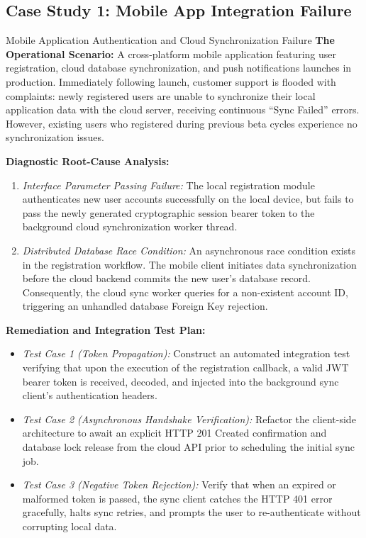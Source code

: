 \documentclass[11pt,a4paper]{article}
\begin{document}
\subsection{Case Study 1: Mobile App Integration Failure}
\begin{casestudybox}{Mobile Application Authentication and Cloud Synchronization Failure}
\textbf{The Operational Scenario:} A cross-platform mobile application featuring user registration, cloud database synchronization, and push notifications launches in production. Immediately following launch, customer support is flooded with complaints: newly registered users are unable to synchronize their local application data with the cloud server, receiving continuous ``Sync Failed'' errors. However, existing users who registered during previous beta cycles experience no synchronization issues.

\textbf{Diagnostic Root-Cause Analysis:}
\begin{enumerate}
    \item \textit{Interface Parameter Passing Failure:} The local registration module authenticates new user accounts successfully on the local device, but fails to pass the newly generated cryptographic session bearer token to the background cloud synchronization worker thread.
    \item \textit{Distributed Database Race Condition:} An asynchronous race condition exists in the registration workflow. The mobile client initiates data synchronization before the cloud backend commits the new user's database record. Consequently, the cloud sync worker queries for a non-existent account ID, triggering an unhandled database Foreign Key rejection.
\end{enumerate}

\textbf{Remediation and Integration Test Plan:}
\begin{itemize}
    \item \textit{Test Case 1 (Token Propagation):} Construct an automated integration test verifying that upon the execution of the registration callback, a valid JWT bearer token is received, decoded, and injected into the background sync client's authentication headers.
    \item \textit{Test Case 2 (Asynchronous Handshake Verification):} Refactor the client-side architecture to await an explicit HTTP 201 Created confirmation and database lock release from the cloud API prior to scheduling the initial sync job.
    \item \textit{Test Case 3 (Negative Token Rejection):} Verify that when an expired or malformed token is passed, the sync client catches the HTTP 401 error gracefully, halts sync retries, and prompts the user to re-authenticate without corrupting local data.
\end{itemize}
\end{casestudybox}
\end{document}
